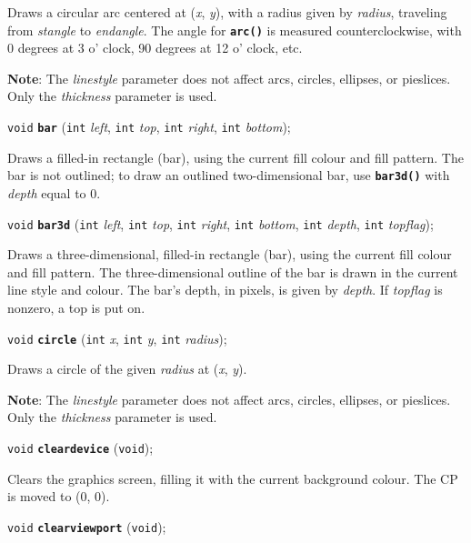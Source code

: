 \documentclass[a4paper,11pt]{article}
\newcommand{\V}{\texttt{void}}      %
\newcommand{\I}{\texttt{int}}       %
\newcommand{\func}[1]{\textbf{\texttt{#1}}}  %
\newcommand{\A}[1]{\emph{#1}}       %
\newenvironment{bgi}
{ %
  \begin{snugshade}
}
{ %
  \end{snugshade}
}
\begin{document}
Draws a circular arc centered at (\A{x}, \A{y}), with a radius given
by \A{radius}, traveling from \A{stangle} to \A{endangle}. The angle
for \func{arc()} is measured counterclockwise, with 0 degrees at 3 o'
clock, 90 degrees at 12 o' clock, etc.

\textbf{Note}: The \A{linestyle} parameter does not affect arcs,
circles, ellipses, or pie\-slices. Only the \A{thickness} parameter is
used.


\begin{bgi}
\V{} \func{bar} (\I{} \A{left}, \I{} \A{top}, \I{} \A{right}, \I{}
\A{bottom});
\end{bgi}

Draws a filled-in rectangle (bar), using the current fill colour and
fill pattern. The bar is not outlined; to draw an outlined
two-dimensional bar, use \func{bar3d()} with \A{depth} equal to 0.


\begin{bgi}
\V{} \func{bar3d} (\I{} \A{left}, \I{} \A{top}, \I{} \A{right}, \I{}
\A{bottom}, \I{} \A{depth}, \I{} \A{topflag});
\end{bgi}

Draws a three-dimensional, filled-in rectangle (bar), using the
current fill colour and fill pattern. The three-dimensional outline of
the bar is drawn in the current line style and colour. The bar's
depth, in pixels, is given by \A{depth}. If \A{topflag} is nonzero, a
top is put on.


\begin{bgi}
\V{} \func{circle} (\I{} \A{x}, \I{} \A{y}, \I{} \A{radius});
\end{bgi}

Draws a circle of the given \A{radius} at (\A{x}, \A{y}).

\textbf{Note}: The \A{linestyle} parameter does not affect arcs,
circles, ellipses, or pie\-slices. Only the \A{thickness} parameter is
used.


\begin{bgi}
\V{} \func{cleardevice} (\V{});
\end{bgi}

Clears the graphics screen, filling it with the current background
colour. The CP is moved to (0, 0).


\begin{bgi}
\V{} \func{clearviewport} (\V{});
\end{bgi}
\end{document}
